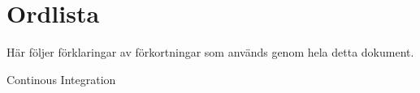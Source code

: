 \section*{Ordlista}
Här följer förklaringar av förkortningar som används genom hela detta dokument.
\begin{description}[leftmargin=!,labelwidth=\widthof{\bfseries Some text}]
\item[CI] Continous Integration
\end{description}